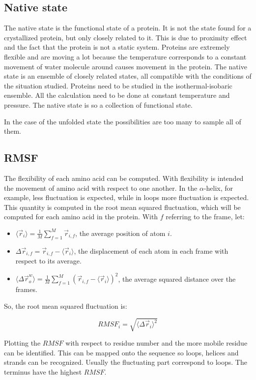 	\subsection{Native state}
	The native state is the functional state of a protein.
	It is not the state found for a crystallized protein, but only closely related to it.
	This is due to proximity effect and the fact that the protein is not a static system.
	Proteins are extremely flexible and are moving a lot because the temperature corresponds to a constant movement of water molecule around causes movement in the protein.
	The native state is an ensemble of closely related states, all compatible with the conditions of the situation studied.
	Proteins need to be studied in the isothermal-isobaric ensemble.
	All the calculation need to be done at constant temperature and pressure.
	The native state is so a collection of functional state.

	In the case of the unfolded state the possibilities are too many to sample all of them.

	\subsection{RMSF}
	The flexibility of each amino acid can be computed.
	With flexibility is intended the movement of amino acid with respect to one another.
	In the $\alpha$-helix, for example, less fluctuation is expected, while in loops more fluctuation is expected.
	This quantity is computed in the root mean squared fluctuation, which will be computed for each amino acid in the protein.
	With $f$ referring to the frame, let:

	\begin{itemize}
		\item $\langle \vec{r}_i\rangle = \frac{1}{M}\sum\limits_{f=1}^M\vec{r}_{i,f}$, the average position of atom $i$.
		\item $\Delta\vec{r}_{i,f} = \vec{r}_{i,f}-\langle\vec{r}_i\rangle$, the displacement of each atom in each frame with respect to its average.
		\item $\langle \Delta\vec{r}_o^w\rangle = \frac{1}{M}\sum\limits_{f=1}^M(\vec{r}_{i,f}-\langle\vec{r}_i\rangle)^2$, the average squared distance over the frames.
	\end{itemize}

	So, the root mean squared fluctuation is:

	$$RMSF_i = \sqrt{\langle\Delta\vec{r}_i\rangle^2}$$

	Plotting the $RMSF$ with respect to residue number and the more mobile residue can be identified.
	This can be mapped onto the sequence so loops, helices and strands can be recognized.
	Usually the fluctuating part correspond to loops.
	The terminus have the highest $RMSF$.

